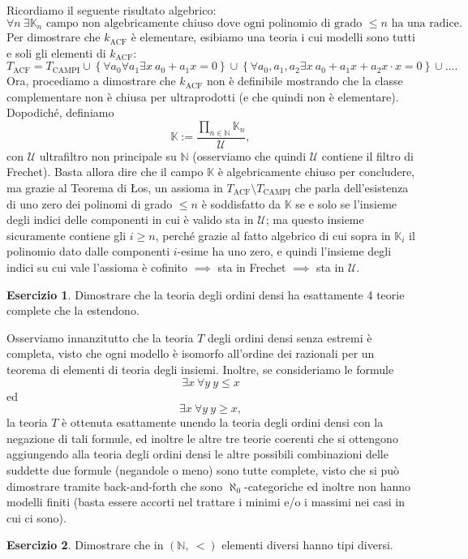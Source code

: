 \documentclass[a4paper]{article}
\newcommand{\K}{\mathbb{K}}
\newcommand{\N}{\mathbb{N}}
\theoremstyle{definition}
\theoremstyle{definition}
\theoremstyle{remark}
\theoremstyle{definition}
\newtheorem*{exercise*}{Esercizio}
\begin{document}
Ricordiamo il seguente risultato algebrico: $$\forall n~\exists \K_n\text{ campo non algebricamente chiuso dove ogni polinomio di grado }\leq n\text{ ha una radice}.$$
Per dimostrare che $k_{\text{ACF}}$ è elementare, esibiamo una teoria i cui modelli sono tutti e soli gli elementi di $k_{\text{ACF}}$: $$ T_{\text{ACF}}=T_{\text{CAMPI}}\cup\left\{ \forall a_0 \forall a_1
\exists x~a_0+a_1 x=0 \right\} \cup \left\{ \forall a_0,a_1,a_2 \exists x~a_0+a_1 x+a_2 x\cdot x=0 \right\} \cup \dots .$$
Ora, procediamo a
dimostrare che $k_{\text{ACF}}$ non è definibile mostrando che la classe complementare non è chiusa per ultraprodotti (e che quindi non è elementare).
Dopodiché, definiamo $$ \K:=\frac{\prod_{n\in \N}{\K_n}}{\mathcal{U}} ,$$ con $\mathcal{U}$ ultrafiltro non principale su $\N$ (osserviamo che quindi
$\mathcal{U}$ contiene il filtro di Frechet). Basta allora dire che il campo $\K$ è algebricamente chiuso per concludere, ma grazie al
Teorema di Łos, un assioma in $T_{\text{ACF}}\setminus T_{\text{CAMPI}}$ che parla dell'esistenza di uno zero dei polinomi di grado $\leq n$ è soddisfatto da $\K$ se e solo se
l'insieme degli indici delle componenti in cui è valido sta in $\mathcal{U}$; ma questo insieme sicuramente contiene gli $i\geq n$, perché grazie al fatto algebrico di cui sopra in
$\K_i$ il polinomio dato dalle componenti
$i$-esime ha uno zero, e quindi l'insieme degli indici su cui vale l'assioma è cofinito $\implies$ sta in Frechet $\implies$ sta in $\mathcal{U}$.
\begin{exercise*}
	Dimostrare che la teoria degli ordini densi ha esattamente 4 teorie complete che la estendono.
\end{exercise*}
Osserviamo innanzitutto che la teoria $T$ degli ordini densi senza estremi è completa, visto che ogni modello è isomorfo all'ordine dei razionali per un teorema di elementi di teoria degli
insiemi. Inoltre, se consideriamo le formule $$\exists x~\forall y~y\leq x$$ ed $$\exists x~\forall y~y\geq x,$$ la teoria $T$ è ottenuta esattamente unendo la teoria degli ordini
densi con la negazione di tali formule, ed inoltre le altre tre teorie coerenti che si ottengono aggiungendo alla teoria degli ordini densi le altre possibili combinazioni delle suddette due
formule (negandole o meno) sono tutte complete, visto che si può dimostrare tramite back-and-forth che sono $\aleph_0$-categoriche ed inoltre non hanno modelli finiti (basta essere
accorti nel trattare i minimi e/o i massimi nei casi in cui ci sono).
\begin{exercise*}
	Dimostrare che in $\left( \N,~< \right) $ elementi diversi hanno tipi diversi.
\end{exercise*}
\end{document}
